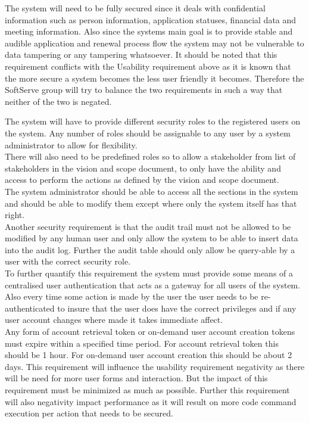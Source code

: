 \begin{flushleft}

The system will need to be fully secured since it deals with confidential information such as person information, application statuses, financial data and meeting information. Also since the systems main goal is to provide stable and audible application and renewal process flow the system may not be vulnerable to data tampering or any tampering whatsoever. It should be noted that this requirement conflicts with the Usability requirement above as it is known that the more secure a system becomes the less user friendly it becomes. Therefore the SoftServe group will try to balance the two requirements in such a way that neither of the two is negated.\\
\vspace{0.1in}

The system will have to provide different security roles to the registered users on the system. Any number of roles should be assignable to any user by a system administrator to allow for flexibility.\\
There will also need to be predefined roles so to allow a stakeholder from list of stakeholders in the vision and scope document, to only have the ability and access to perform the actions as defined by the vision and scope document.\\
The system administrator should be able to access all the sections in the system and should be able to modify them except where only the system itself has that right.\\
Another security requirement is that the audit trail must not be allowed to be modified by any human user and only allow the system to be able to insert data into the audit log. Further the audit table should only allow be query-able by a user with the correct security role.\\
To further quantify this requirement the system must provide some means of a centralised user authentication that acts as a gateway for all users of the system. Also every time some action is made by the user the user needs to be re-authenticated to insure that the user does have the correct privileges and if any user account changes where made it takes immediate affect. \\
Any form of account retrieval token or on-demand user account creation tokens must expire within a specified time period. For account retrieval token this should be 1 hour. For on-demand user account creation this should be about 2 days.
\vspace{0.1in}
This requirement will influence the usability requirement negativity as there will be need for more user forms and interaction. But the impact of this requirement must be minimized as much as possible. Further this requirement will also negativity impact performance as it will result on more code command execution per action that needs to be secured.  

\end{flushleft}

